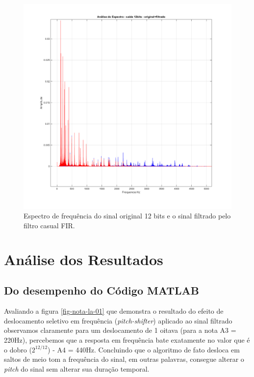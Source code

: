 		\begin{figure}[!ht]
			\centering
			\includegraphics[scale=0.5]{./figuras/simulacoes/audio12bits-original-filtrado.png}
			\caption{Espectro de frequência do sinal original 12 bits e o sinal filtrado pelo filtro casual FIR.}
			\label{fig-sinal12bits-filtrado}
		\end{figure}
		
		
		\section{Análise dos Resultados}
			
			\subsection{Do desempenho do Código MATLAB}
			
				Avaliando a figura \ref{fig-nota-la-01} que demonstra o resultado do efeito de deslocamento seletivo em frequência (\textit{pitch-shifter}) aplicado ao sinal filtrado observamos claramente para um deslocamento de 1 oitava (para a nota A3 = 220Hz), percebemos que a resposta em frequência bate exatamente no valor que é o dobro ($ 2^{12/12} $) - A4 = 440Hz. Concluindo que o algoritmo de fato desloca em saltos de meio tom a frequência do sinal, em outras palavras, consegue alterar o \textit{pitch} do sinal sem alterar sua duração temporal.
				
